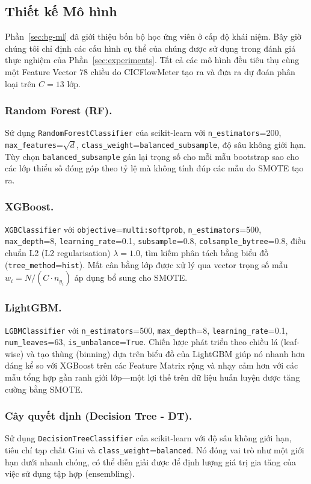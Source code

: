 \subsection{Thiết kế Mô hình}
\label{sec:model-design}

Phần~\ref{sec:bg-ml} đã giới thiệu bốn bộ học ứng viên ở cấp độ khái niệm. Bây giờ chúng tôi chỉ định các cấu hình cụ thể của chúng được sử dụng trong đánh giá thực nghiệm của Phần~\ref{sec:experiments}. Tất cả các mô hình đều tiêu thụ cùng một Feature Vector $78$ chiều do CICFlowMeter tạo ra và đưa ra dự đoán phân loại trên $C = 13$ lớp.

\subsubsection*{Random Forest (RF).}
Sử dụng \texttt{RandomForestClassifier} của scikit-learn với \texttt{n\_estimators}=200, \texttt{max\_features}=$\sqrt{d}$, \texttt{class\_weight}=\texttt{balanced\_subsample}, độ sâu không giới hạn. Tùy chọn \texttt{balanced\_subsample} gán lại trọng số cho mỗi mẫu bootstrap sao cho các lớp thiểu số đóng góp theo tỷ lệ mà không tính đúp các mẫu do SMOTE tạo ra.

\subsubsection*{XGBoost.}
\texttt{XGBClassifier} với \texttt{objective}=\texttt{multi:softprob}, \texttt{n\_estimators}=500, \texttt{max\_depth}=8, \texttt{learning\_rate}=0.1, \texttt{subsample}=0.8, \texttt{colsample\_bytree}=0.8, điều chuẩn L2 (L2 regularisation) $\lambda=1.0$, tìm kiếm phân tách bằng biểu đồ (\texttt{tree\_method}=\texttt{hist}). Mất cân bằng lớp được xử lý qua vector trọng số mẫu $w_i = N / (C \cdot n_{y_i})$ áp dụng bổ sung cho SMOTE.

\subsubsection*{LightGBM.}
\texttt{LGBMClassifier} với \texttt{n\_estimators}=500, \texttt{max\_depth}=8, \texttt{learning\_rate}=0.1, \texttt{num\_leaves}=63, \texttt{is\_unbalance}=\texttt{True}. Chiến lược phát triển theo chiều lá (leaf-wise) và tạo thùng (binning) dựa trên biểu đồ của LightGBM giúp nó nhanh hơn đáng kể so với XGBoost trên các Feature Matrix rộng và nhạy cảm hơn với các mẫu tổng hợp gần ranh giới lớp---một lợi thế trên dữ liệu huấn luyện được tăng cường bằng SMOTE.

\subsubsection*{Cây quyết định (Decision Tree - DT).}
Sử dụng \texttt{DecisionTreeClassifier} của scikit-learn với độ sâu không giới hạn, tiêu chí tạp chất Gini và \texttt{class\_weight}=\texttt{balanced}. Nó đóng vai trò như một giới hạn dưới nhanh chóng, có thể diễn giải được để định lượng giá trị gia tăng của việc sử dụng tập hợp (ensembling).

